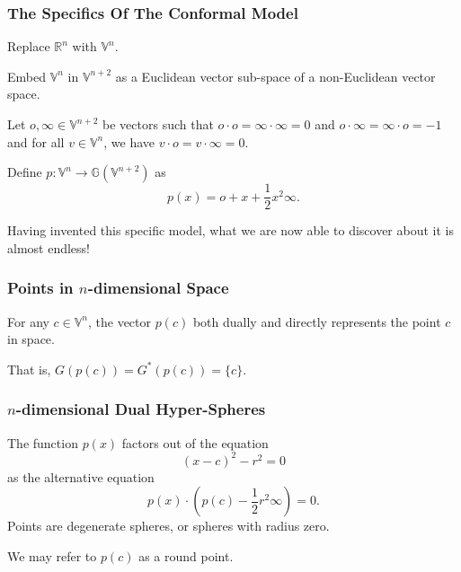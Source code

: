 \documentclass{beamer}
\newcommand{\G}{\mathbb{G}}
\newcommand{\V}{\mathbb{V}}
\newcommand{\R}{\mathbb{R}}
\newcommand{\nvao}{o}
\newcommand{\nvai}{\infty}
\begin{document}
\begin{frame}
\frametitle{The Specifics Of The Conformal Model}
Replace $\R^n$ with $\V^n$.\pause

Embed $\V^n$ in $\V^{n+2}$ as a \alert{Euclidean} vector sub-space of a \alert{non-Euclidean} vector space.\pause

Let $\nvao,\nvai\in\V^{n+2}$ be vectors such that $\nvao\cdot\nvao=\nvai\cdot\nvai=0$
and $\nvao\cdot\nvai=\nvai\cdot\nvao=-1$ and for all $v\in\V^n$, we have $v\cdot\nvao=v\cdot\nvai=0$.\pause

\begin{definition}
Define $p:\V^n\to\G(\V^{n+2})$ as
\begin{equation*}
p(x) = \nvao + x + \frac{1}{2}x^2\nvai.
\end{equation*}
\end{definition}\pause
Having \alert{invented} this specific model, what we are now able to \alert{discover} about it is almost endless!
\end{frame}

\begin{frame}
\frametitle{Points in $n$-dimensional Space}
For any $c\in\V^n$, the vector $p(c)$ both \alert{dually} and \alert{directly} represents the point $c$ in space.\pause

That is, $G(p(c)) = G^*(p(c)) = \{c\}$.
\end{frame}

\begin{frame}
\frametitle{$n$-dimensional \alert{Dual} Hyper-Spheres}
The function $p(x)$ factors out of the equation
\begin{equation*}
(x-c)^2 - r^2 = 0
\end{equation*}
as the alternative equation
\begin{equation*}
p(x)\cdot\left(p(c) - \frac{1}{2}r^2\nvai\right) = 0.
\end{equation*}\pause
Points are degenerate spheres, or spheres with radius zero.\pause

We may refer to $p(c)$ as a \alert{round} point.
\end{frame}
\end{document}
